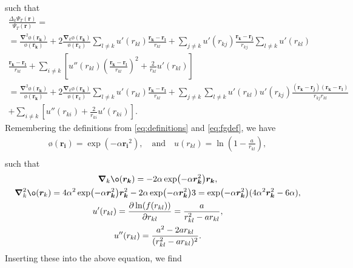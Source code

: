 such that
\begin{gather*}
	\frac{\Delta_k \Psi _T(\boldsymbol{r})}{\Psi _T(\boldsymbol{r})} = \\
	= \frac{\boldsymbol{\nabla} ^2ø(\boldsymbol{r_k})}{ø(\boldsymbol{r_k})}+ 2 \frac{\boldsymbol{\nabla }_k ø(\boldsymbol{r_k})}{ø(\boldsymbol{r}_k)}\sum_{l \neq k}^{} u'(r _{kl}) \frac{\boldsymbol{r_k}-\boldsymbol{r_l}}{r _{kl}}
	+\sum_{j \neq k}^{} u'(r _{kj})
	\frac{\boldsymbol{r_k}-\boldsymbol{r_j}}{r _{kj}}
	\sum_{l \neq k}^{} u'(r _{kl})\\
	\frac{\boldsymbol{r_k}-\boldsymbol{r_l}}{r _{kl}}+ \sum_{i \neq k}
	\left[u''(r _{kl}) \left( \frac{\boldsymbol{r_k}-\boldsymbol{r_l}}{r
			_{kl}}\right)^2+\frac{2}{r _{kl}}u'(r _{kl})\right]\\
	=\frac{\boldsymbol{\nabla} ^2ø(\boldsymbol{r_k})}{ø(\boldsymbol{r_k})}+ 2 \frac{\boldsymbol{\nabla }_k ø(\boldsymbol{r_k})}{ø(\boldsymbol{r}_k)}\sum_{l \neq k}^{} u'(r _{kl}) \frac{\boldsymbol{r_k}-\boldsymbol{r_l}}{r _{kl}}
	+\sum_{j \neq k}^{} \sum_{l \neq k}^{} u'(r _{kl})u'(r
		_{kj})\frac{(\boldsymbol{r_k}-\boldsymbol{r_j})(\boldsymbol{r_k}-\boldsymbol{r_l})}{r
		_{kj}r _{kl}}\\
	+\sum_{i \neq k}^{} \left[u''(r _{ki})+\frac{2}{r _{ki}}u'(r _{ki})\right].
\end{gather*}
Remembering the definitions from \autoref{eq:definitions} and
\autoref{eq:fgdef}, we have
\begin{gather*}
	ø(\boldsymbol{r_i}) = \exp(-\alpha \boldsymbol{r_i}^2), \quad \text{and}
	\quad u(r _{kl})=\ln(1-\frac{a}{r _{kl}}),\\
\end{gather*}
such that
\begin{gather*}
	\grad_kø(\boldsymbol{r_k}) = -2\alpha \exp(-\alpha \boldsymbol{r_k}^2)
	\boldsymbol{r_k},\\
	\grad^2_k ø(\boldsymbol{r}_k) = 4\alpha^2 \exp(-\alpha
	\boldsymbol{r_k}^2)\boldsymbol{r_k}^2-2\alpha \exp(-\alpha
	\boldsymbol{r_k}^2)3=\exp(-\alpha \boldsymbol{r_k}^2)(4\alpha ^2
	\boldsymbol{r_k}^2-6\alpha ),\\
	u'(r _{kl}) = \frac{\partial \ln(f(r _{kl}))}{\partial r _{kl}} =
	\frac{a}{r _{kl}^2-ar _{kl}},\\
	u''(r _{kl}) = \frac{a^2-2ar _{kl}}{(r _{kl}^2-ar _{kl})^2}.
\end{gather*}
Inserting these into the above equation, we find
